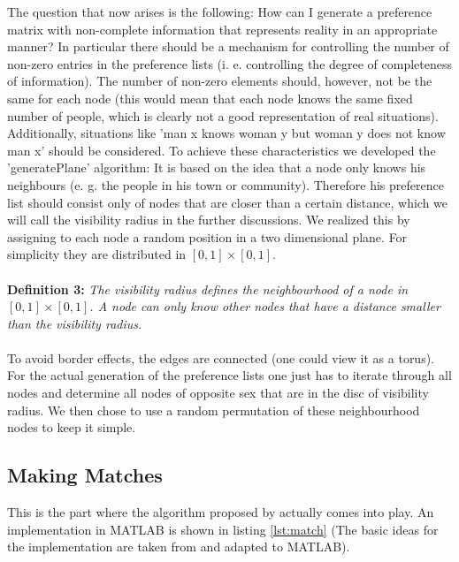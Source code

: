 \documentclass[11pt]{article}
\begin{document}
The question that now arises is the following: How can I generate a preference matrix
with non-complete information that represents reality in an appropriate manner? In 
particular there should be a mechanism for controlling the number of non-zero entries 
in the preference lists (i. e. controlling the degree of completeness of information). The 
number of non-zero elements should, however, not be the same for each node (this would 
mean that each node knows the same fixed number of people, which is clearly not a good 
representation of real situations). Additionally, situations like 'man x knows woman y but 
woman y does not know man x' should be considered.
To achieve these characteristics we developed the 'generatePlane' algorithm: It is based on 
the idea that a node only knows his neighbours (e. g. the people in his town or community). 
Therefore his preference list should consist only of nodes that are closer than a certain 
distance, which we will call the visibility radius in the further discussions. We realized this 
by assigning to each node a random position in a two dimensional plane. For simplicity they 
are distributed in $[0,1]\times[0,1]$. 
\\
\\
\textbf{Definition 3: }\textit{The visibility radius defines the neighbourhood of a node in $[0,1]\times[0,1]$. A node can only know other
nodes that have a distance smaller than the visibility radius.\label{eq:3}}
\\
\\
To avoid border effects, the edges are connected (one could 
view it as a torus). For the actual generation of the preference lists one just has to iterate 
through all nodes and determine all nodes of opposite sex that are in the disc of visibility 
radius. We then chose to use a random permutation of these neighbourhood nodes to keep it 
simple.

\subsection{Making Matches}

This is the part where the algorithm proposed by \citet{1962} actually comes into play. An implementation in MATLAB is shown in listing
\ref{lst:match} (The basic ideas for the implementation are taken from \citet{rosetta} and adapted to MATLAB).

\begin{figure}

\end{figure}
\end{document}
